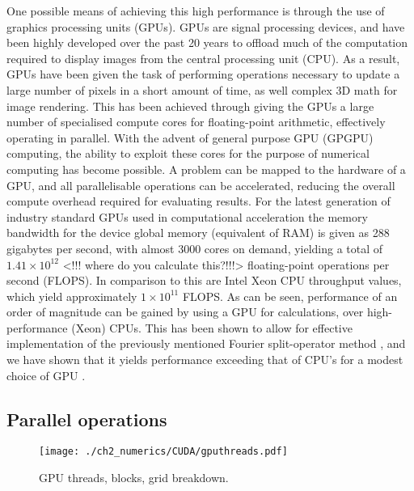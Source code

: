 One possible means of achieving this high performance is through the use of graphics processing units (GPUs). GPUs are signal processing devices, and have been highly developed over the past 20 years to offload much of the computation required to display images from the central processing unit (CPU). As a result, GPUs have been given the task of performing operations necessary to update a large number of pixels in a short amount of time, as well complex 3D math for image rendering. This has been achieved through giving the GPUs a large number of specialised compute cores for floating-point arithmetic, effectively operating in parallel. With the advent of general purpose GPU (GPGPU) computing, the ability to exploit these cores for the purpose of numerical computing has become possible. A problem can be mapped to the hardware of a GPU, and all parallelisable operations can be accelerated, reducing the overall compute overhead required for evaluating results. For the latest generation of industry standard GPUs used in computational acceleration the memory bandwidth for the device global memory (equivalent of RAM) is given as 288 gigabytes per second, with almost 3000 cores on demand, yielding a total of $1.41\times10^{12}$ <!!! where do you calculate this?!!!> floating-point operations per second (FLOPS). In comparison to this are Intel Xeon CPU throughput values, which yield approximately $1\times10^{11}$ FLOPS. As can be seen, performance of an order of magnitude can be gained by using a GPU for calculations, over high-performance (Xeon) CPUs. This has been shown to allow for effective implementation of the previously mentioned Fourier split-operator method \cite{Num:Bauke_cpc_2011}, and we have shown that it yields performance exceeding that of CPU's for a modest choice of GPU \cite{AO:Morgan_ORiordan_pra_2013}.


\subsection{Parallel operations}
\label{sub:Parallel operations}

\begin{figure}
    \centering
    \texttt{[image: ./ch2\_numerics/CUDA/gputhreads.pdf]}
    \caption{GPU threads, blocks, grid breakdown.}
    \label{fig:gpu_threads}
\end{figure}
